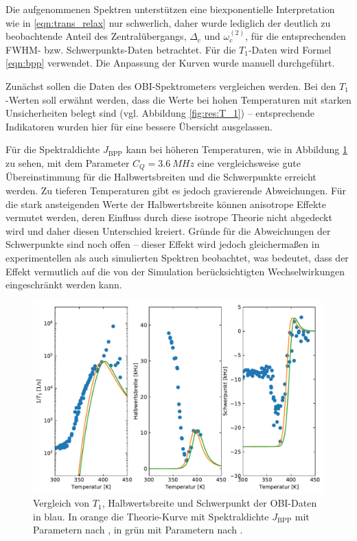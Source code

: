 Die aufgenommenen Spektren unterstützen eine biexponentielle Interpretation wie in \eqref{eqn:trans_relax} nur schwerlich, daher wurde lediglich der deutlich zu beobachtende Anteil des Zentralübergangs, $\Delta_c$ und $\omega_c^{(2)}$, für die entsprechenden FWHM- bzw. Schwer\-punkts-Da\-ten betrachtet. Für die $T_1$-Daten wird Formel \eqref{eqn:bpp} verwendet. Die Anpassung der Kurven wurde manuell durchgeführt.



Zunächst sollen die Daten des OBI-Spektrometers vergleichen werden. Bei den $T_1$-Werten soll erwähnt werden, dass die Werte bei hohen Temperaturen mit starken Unsicherheiten belegt sind (vgl. Abbildung \ref{fig:res:T_1}) -- entsprechende Indikatoren wurden hier für eine bessere Übersicht ausgelassen.

Für die Spektraldichte $J_\text{BPP}$ kann bei höheren Temperaturen, wie in Abbildung \ref{fig:res:theorie_j} zu sehen, mit dem Parameter $C_Q = \SI{3.6}{MHz}$ eine vergleichsweise gute Übereinstimmung für die Halbwertsbreiten und die Schwerpunkte erreicht werden. Zu tieferen Temperaturen gibt es jedoch gravierende Abweichungen. Für die stark ansteigenden Werte der Halbwertsbreite können anisotrope Effekte vermutet werden, deren Einfluss durch diese isotrope Theorie nicht abgedeckt wird und daher diesen Unterschied kreiert. Gründe für die Abweichungen der Schwerpunkte sind noch offen -- dieser Effekt wird jedoch gleichermaßen in experimentellen als auch simulierten Spektren beobachtet, was bedeutet, dass der Effekt vermutlich auf die von der Simulation berücksichtigten Wechselwirkungen eingeschränkt werden kann.
\begin{figure}
	\begin{center}
		\includegraphics[width=.9\textwidth]{graphics/plot/OBI_J_02.pdf}
	\end{center}
	\caption{Vergleich von $T_1$, Halbwertsbreite und Schwerpunkt der OBI-Daten in blau. In orange die Theorie-Kurve mit Spektraldichte $J_\text{BPP}$ mit Parametern nach \cite{PIMENOV199793}, in grün mit Parametern nach \cite{crn_augsburg}.} \label{fig:res:theorie_j}
\end{figure}

